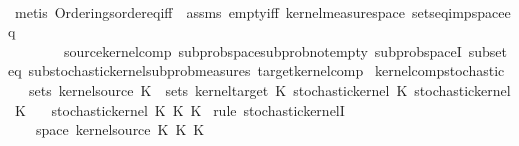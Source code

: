 \begin{isabellebody}
\ \ \ \ \isamarkupfalse%
\ {\isacharparenleft}{\kern0pt}metis\ Orderings{\isachardot}{\kern0pt}order{\isacharunderscore}{\kern0pt}eq{\isacharunderscore}{\kern0pt}iff\ {\isasymomega}\ assms\ empty{\isacharunderscore}{\kern0pt}iff\ kernel{\isacharunderscore}{\kern0pt}measure{\isacharunderscore}{\kern0pt}space\ sets{\isacharunderscore}{\kern0pt}eq{\isacharunderscore}{\kern0pt}imp{\isacharunderscore}{\kern0pt}space{\isacharunderscore}{\kern0pt}eq\ \isanewline
\ \ \ \ \ \ \ \ source{\isacharunderscore}{\kern0pt}kernel{\isacharunderscore}{\kern0pt}comp\ subprob{\isacharunderscore}{\kern0pt}space{\isachardot}{\kern0pt}subprob{\isacharunderscore}{\kern0pt}not{\isacharunderscore}{\kern0pt}empty\ subprob{\isacharunderscore}{\kern0pt}spaceI\ subset{\isacharunderscore}{\kern0pt}eq\ substochastic{\isacharunderscore}{\kern0pt}kernel{\isachardot}{\kern0pt}subprob{\isacharunderscore}{\kern0pt}measures\ target{\isacharunderscore}{\kern0pt}kernel{\isacharunderscore}{\kern0pt}comp{\isacharparenright}{\kern0pt}\isanewline
{}\isamarkupfalse%
%
\endisatagproof
{\isafoldproof}%
%
\isadelimproof
\isanewline
%
\endisadelimproof
\isanewline
{}\isamarkupfalse%
\ kernel{\isacharunderscore}{\kern0pt}comp{\isacharunderscore}{\kern0pt}stochastic{\isacharcolon}{\kern0pt}\isanewline
\ \ \ {\isachardoublequoteopen}sets\ {\isacharparenleft}{\kern0pt}kernel{\isacharunderscore}{\kern0pt}source\ K\ {\isacharequal}{\kern0pt}\ sets\ {\isacharparenleft}{\kern0pt}kernel{\isacharunderscore}{\kern0pt}target\ K\ {\isachardoublequoteopen}stochastic{\isacharunderscore}{\kern0pt}kernel\ K\ {\isachardoublequoteopen}stochastic{\isacharunderscore}{\kern0pt}kernel\ K\isanewline
\ \ \ {\isachardoublequoteopen}stochastic{\isacharunderscore}{\kern0pt}kernel\ {\isacharparenleft}{\kern0pt}K\ {\isasymcirc}\isactrlsub K\ K\isanewline
%
\isadelimproof
%
\endisadelimproof
%
\isatagproof
{}\isamarkupfalse%
\ {\isacharparenleft}{\kern0pt}rule\ stochastic{\isacharunderscore}{\kern0pt}kernelI{\isacharparenright}{\kern0pt}\isanewline
\ \ \isamarkupfalse%
\ {\isasymomega}\ \isamarkupfalse%
\ {\isasymomega}{\isacharcolon}{\kern0pt}\ {\isachardoublequoteopen}{\isasymomega}\ {\isasymin}\ space\ {\isacharparenleft}{\kern0pt}kernel{\isacharunderscore}{\kern0pt}source\ {\isacharparenleft}{\kern0pt}K\ {\isasymcirc}\isactrlsub K\ K\isanewline

\end{isabellebody}
